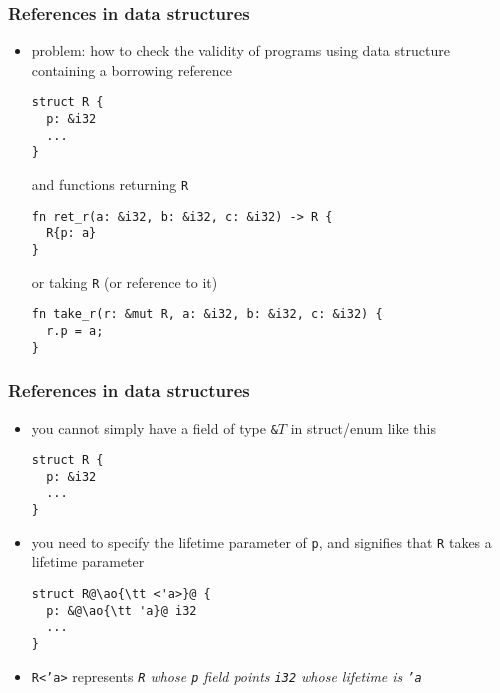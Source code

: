\documentclass[12pt,dvipdfmx]{beamer}
\newcommand{\ao}[1]{{\color{blue}#1}}
\begin{document}
\begin{frame}[fragile]
  \frametitle{References in data structures}
  \begin{itemize}
  \item problem: how to check the validity of programs using
    data structure containing a borrowing reference
\begin{lstlisting}
struct R {
  p: &i32
  ...
}
\end{lstlisting}
and functions returning {\tt R}
\begin{lstlisting}
fn ret_r(a: &i32, b: &i32, c: &i32) -> R {
  R{p: a}
}    
\end{lstlisting}
or taking {\tt R} (or reference to it)
\begin{lstlisting}
fn take_r(r: &mut R, a: &i32, b: &i32, c: &i32) {
  r.p = a;
}    
\end{lstlisting}
  \end{itemize}
\end{frame}

\begin{frame}[fragile]
  \frametitle{References in data structures}
  \begin{itemize}
  \item you cannot simply have a field of type {\tt \&$T$}
    in struct/enum like this
\begin{lstlisting}
struct R {
  p: &i32
  ...
}
\end{lstlisting}
\item you need to specify the lifetime parameter of {\tt p},
  and signifies that {\tt R} takes a lifetime parameter
\begin{lstlisting}
struct R@\ao{\tt <'a>}@ {
  p: &@\ao{\tt 'a}@ i32
  ...
}
\end{lstlisting}
\item {\tt R<'a>} represents \ao{\it {\tt R} whose {\tt p} field
  points {\tt i32} whose lifetime is {\tt 'a}}
\end{itemize}
\end{frame}
\end{document}
